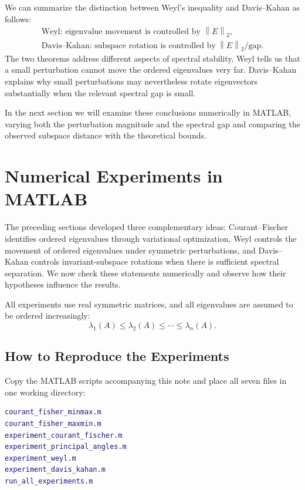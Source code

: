 \documentclass[14pt,letterpaper]{article}
\theoremstyle{plain}
\theoremstyle{definition}
\theoremstyle{remark}
\newcommand{\norm}[1]{\left\lVert #1 \right\rVert}
\begin{document}
We can summarize the distinction between Weyl's
inequality and Davis--Kahan as follows:
\[
\boxed{
\begin{array}{c}
\text{Weyl: eigenvalue movement is controlled by }\norm{E}_2,\\[4pt]
\text{Davis--Kahan: subspace rotation is controlled by}
\ \norm{E}_2/\text{gap}.
\end{array}
}
\]
The two theorems address different aspects of
spectral stability. Weyl tells us that a small
perturbation cannot move the ordered eigenvalues
very far. Davis--Kahan explains why small
perturbations may nevertheless rotate eigenvectors
substantially when the relevant spectral gap is small.

In the next section we will examine these conclusions
numerically in MATLAB, varying both the perturbation
magnitude and the spectral gap and comparing the
observed subspace distance with the theoretical bounds.

\section{Numerical Experiments in MATLAB}
\label{sec:numerical_experiments}

The preceding sections developed three complementary ideas:
Courant--Fischer identifies ordered eigenvalues through
variational optimization, Weyl controls the movement of
ordered eigenvalues under symmetric perturbations, and
Davis--Kahan controls invariant-subspace rotations when
there is sufficient spectral separation. We now check
these statements numerically and observe how their
hypotheses influence the results.


All experiments use real symmetric matrices, and all
eigenvalues are assumed to be ordered increasingly:
\[
\lambda_1(A)\leq\lambda_2(A)\leq\cdots\leq\lambda_n(A).
\]

\subsection{How to Reproduce the Experiments}
\label{subsec:matlab_setup}

Copy the MATLAB scripts accompanying this note
and place all seven files in one working directory:
\begin{lstlisting}[language=Matlab]
courant_fisher_minmax.m
courant_fisher_maxmin.m
experiment_courant_fischer.m
experiment_principal_angles.m
experiment_weyl.m
experiment_davis_kahan.m
run_all_experiments.m
\end{lstlisting}
\end{document}
